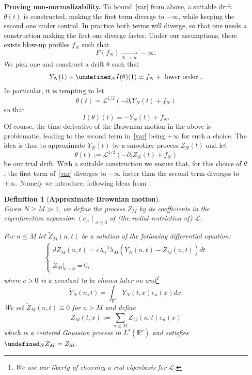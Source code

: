 \documentclass[%
11pt,  reqno]{amsart}
\newtheorem{definition}[theorem]{Definition}
\theoremstyle{remarkstyle}
\newcommand{\1}{\hspace{0.2mm}\text{I}\hspace{0.2mm}}
\newcommand{\R}{\mathbb{R}}
\let\P= \undefined
\newcommand{\P}{\mathbf{P}}
\renewcommand{\L}{\mathcal{L}}
\newcommand{\ld}{\lambda}
\newcommand{\wt}{\widetilde}
\numberwithin{equation}{section}
\numberwithin{theorem}{section}
\begin{document}
	\noindent \textbf{Proving non-normalizability.} To bound~\eqref{var} from above, a suitable drift $\theta (t)$ is constructed, making the first term diverge to $-\infty$, while keeping the second one under control. In practice both terms will diverge, so that one needs a construction making the first one diverge faster. Under our assumptions, there exists blow-up profiles $f_N$ such that 
	\[ 
	F (f_N) \underset{N\to \infty}{\to} - \infty.
	\]
	We pick one and construct a drift $\theta$ such that 
	\[ 
	Y_N (1) + \P_{N}I(\theta) (1) \simeq f_N + \mbox{ lower order }.
	\]
	In particular, it is tempting to let 
	\[
	\theta (t) = \L^{1/2} \left( -\partial_t Y_N (t) + f_N \right)
	\]
	so that 
	\[ 
	I(\theta) (t) = - Y_N (t) + f_N.
	\]
	Of course, the time-derivative of the Brownian motion in the above is problematic, leading to the second term in~\eqref{var} being $+\infty$ for such a choice. The idea is thus to approximate $Y_N (t)$ by a smoother process $Z_N (t)$ and let    
	\[
	\theta (t) := \L^{1/2} \left( -\partial_t Z_N (t) + f_N \right)
	\]
	be our trial drift. With a suitable construction we ensure that, for this choice of $\theta$, the first term of~\eqref{var} diverges to $-\infty$ faster than the second term diverges to $+\infty$. Namely we introduce, following ideas from~\cite{TW23}.
	
	\begin{definition}[\textbf{Approximate Brownian motion}]\label{def:gaussapprox}\mbox{}\\
		Given $ N \ge M\gg 1$,  we define the process $Z_M$ by its coefficients in the eigenfunction expansion $(e_n)_{n\geq 0}$ of (the radial restriction of) $\L$.
		
		For $n \leq M$ let $\wt Z_M(n, t)$ be a solution of the following  differential equation:
		\begin{align}
			\begin{cases}
				d \wt Z_{M}(n, t) = c \ld_n^{-1} \ld_M   (\wt Y_N (n,t)- \wt Z_{M}(n, t)) dt \\
				\wt Z_{M}|_{t = 0} =0, 
			\end{cases}
			\label{ZZZ}
		\end{align}
		where $c>0$ is a constant to be chosen later on and\footnote{We use our liberty of choosing a real eigenbasis for $\L$.}
		$$ \wt Y_N (n,t) = \int_{\R^d} Y_N(t,x) e_n(x) dx. $$
		We set $\wt Z_{M}(n, t)  \equiv 0$ for $n > M$ and define
		$$Z_M(t,x) := \sum_{n \le M} \wt Z_M(n,t) e_n(x)$$ 
		which is a centered Gaussian process in $L^2({\R^d})$ and satisfies $\P_N Z_M = Z_M$.  
	\end{definition}
	
\end{document}
